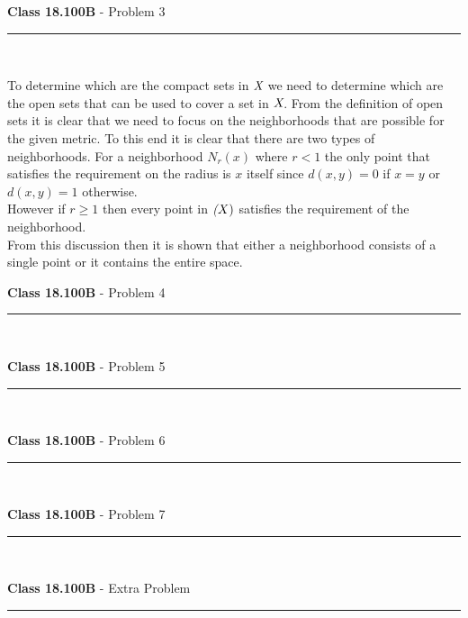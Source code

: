 \documentclass[11pt,reqno]{article}
\begin{document}
\vspace{15pt}
\begin{flushleft} 
\textbf{Class 18.100B} - Problem 3\\
\rule{500pt}{1pt}\\
\end{flushleft} 

To determine which are the compact sets in $\emph{X}$ we need to determine which are the open sets that can be used to cover a set in $\emph{X}$.
From the definition of open sets it is clear that we need to focus on the neighborhoods that are possible for the given metric. To this end it is clear that there are two types of neighborhoods. For a neighborhood $N_r(x)$ where $r < 1$ the only point that satisfies the requirement on the radius is $x$ itself since $d(x,y) = 0$ if $x = y$ or $d(x,y) = 1$ otherwise.  \\
\indent However if $r \ge 1$ then every point in $\emph(X)$ satisfies the requirement of the neighborhood.\\
\indent From this discussion then it is shown that either a neighborhood consists of a single point or it contains the entire space.

\vspace{15pt}
\begin{flushleft} 
\textbf{Class 18.100B} - Problem 4\\
\rule{500pt}{1pt}\\
\end{flushleft} 

\vspace{15pt}
\begin{flushleft} 
\textbf{Class 18.100B} - Problem 5\\
\rule{500pt}{1pt}\\
\end{flushleft} 

\vspace{15pt}
\begin{flushleft} 
\textbf{Class 18.100B} - Problem 6\\
\rule{500pt}{1pt}\\
\end{flushleft} 

\vspace{15pt}
\begin{flushleft} 
\textbf{Class 18.100B} - Problem 7\\
\rule{500pt}{1pt}\\
\end{flushleft} 

\vspace{15pt}
\begin{flushleft} 
\textbf{Class 18.100B} - Extra Problem \\
\rule{500pt}{1pt}\\
\end{flushleft} 
\end{document}

